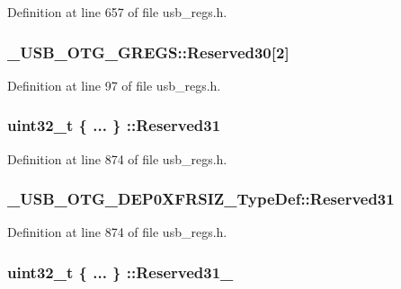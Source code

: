 Definition at line 657 of file usb\-\_\-regs.\-h.

\hypertarget{group___u_s_b___o_t_g___d_r_i_v_e_r_ga30233663b98834cfbc214a65f8b94339}{
\subsubsection[{Reserved30}]{ \-\_\-\-U\-S\-B\-\_\-\-O\-T\-G\-\_\-\-G\-R\-E\-G\-S\-::\-Reserved30\mbox{[}2\mbox{]}}}\label{group___u_s_b___o_t_g___d_r_i_v_e_r_ga30233663b98834cfbc214a65f8b94339}


Definition at line 97 of file usb\-\_\-regs.\-h.

\hypertarget{group___u_s_b___o_t_g___d_r_i_v_e_r_ga9ae70ee81e7827107f8e6d7e6c5e5282}{
\subsubsection[{Reserved31}]{\setlength{\rightskip}{0pt plus 5cm}uint32\-\_\-t \{ ... \} \-::Reserved31}}\label{group___u_s_b___o_t_g___d_r_i_v_e_r_ga9ae70ee81e7827107f8e6d7e6c5e5282}


Definition at line 874 of file usb\-\_\-regs.\-h.

\hypertarget{group___u_s_b___o_t_g___d_r_i_v_e_r_ga6d6ad8f751aee7074cdbce99708c75b6}{
\subsubsection[{Reserved31}]{ \-\_\-\-U\-S\-B\-\_\-\-O\-T\-G\-\_\-\-D\-E\-P0\-X\-F\-R\-S\-I\-Z\-\_\-\-Type\-Def\-::\-Reserved31}}\label{group___u_s_b___o_t_g___d_r_i_v_e_r_ga6d6ad8f751aee7074cdbce99708c75b6}


Definition at line 874 of file usb\-\_\-regs.\-h.

\hypertarget{group___u_s_b___o_t_g___d_r_i_v_e_r_ga14ac5883a3cb79f68ae0a8bc79fd2717}{
\subsubsection[{Reserved31\-\_\-20}]{\setlength{\rightskip}{0pt plus 5cm}uint32\-\_\-t \{ ... \} \-::Reserved31\-\_}}\label{group___u_s_b___o_t_g___d_r_i_v_e_r_ga14ac5883a3cb79f68ae0a8bc79fd2717}



